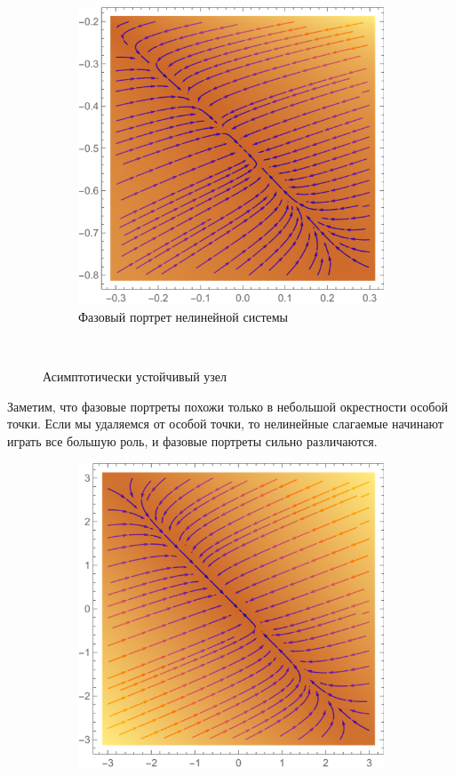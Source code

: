 \documentclass[12pt, a4paper]{article}
\begin{document}
\begin{enumerate}
\begin{figure}[H]
\begin{subfigure}[H]{0.4\textwidth}
 		\includegraphics[width=\textwidth]{p1_1_2}
 		\caption{Фазовый портрет нелинейной системы}
 		\label{newfazov}
 	\end{subfigure}	
 	\\[0.2cm]
 	\caption{Асимптотически устойчивый узел}
 \end{figure}	
Заметим, что фазовые портреты похожи только в небольшой окрестности особой точки. Если мы удаляемся от особой точки, то нелинейные слагаемые начинают играть все большую роль, и фазовые портреты сильно различаются.
\begin{figure}[H]
	\centering
	\begin{subfigure}[H]{0.4\textwidth}
		\includegraphics[width=\textwidth]{p1_2_1}

\end{subfigure}
\end{figure}
\end{enumerate}
\end{document}
